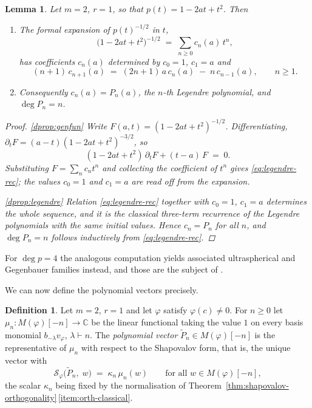 \documentclass[12pt]{amsart}
\theoremstyle{plain}
\newtheorem{lemma}[theorem]{Lemma}
\theoremstyle{definition}
\newtheorem{definition}[theorem]{Definition}
\newcommand{\CC}{\mathbb{C}}
\newcommand{\Mf}{M(\varphi)}          %
\newcommand{\Sf}{\mathcal{S}_\varphi} %
\newcommand{\vf}{v_\varphi}           %
\begin{document}
\begin{lemma}
\label{lem:dictionary-properties}
Let $m = 2$, $r = 1$, so that $p(t) = 1 - 2at + t^2$. Then
\begin{enumerate}[label=\textup{(D\arabic*)}]
  \item\label{dprop:genfun} The formal expansion of $p(t)^{-1/2}$ in $t$,
    \[
      \bigl(1 - 2at + t^2\bigr)^{-1/2} \;=\; \sum_{n \geq 0} c_n(a)\, t^n ,
    \]
    has coefficients $c_n(a)$ determined by $c_0 = 1$, $c_1 = a$ and
    \begin{equation}\label{eq:legendre-rec}
      (n+1)\,c_{n+1}(a) \;=\; (2n+1)\,a\,c_n(a) \;-\; n\,c_{n-1}(a),
      \qquad n \geq 1 .
    \end{equation}
  \item\label{dprop:legendre} Consequently $c_n(a) = P_n(a)$, the $n$-th
    Legendre polynomial, and $\deg P_n = n$.
\end{enumerate}
\begin{proof}
\ref{dprop:genfun} Write $F(a,t) = (1-2at+t^2)^{-1/2}$. Differentiating,
$\partial_t F = (a-t)(1-2at+t^2)^{-3/2}$, so
\[
  (1 - 2at + t^2)\,\partial_t F + (t-a)\,F \;=\; 0 .
\]
Substituting $F = \sum_n c_n t^n$ and collecting the coefficient of $t^n$
gives \eqref{eq:legendre-rec}; the values $c_0 = 1$ and $c_1 = a$ are read
off from the expansion.

\ref{dprop:legendre} Relation \eqref{eq:legendre-rec} together with
$c_0 = 1$, $c_1 = a$ determines the whole sequence, and it is the
classical three-term recurrence of the Legendre polynomials
\cite[eq.~(4.7.17)]{Szego1939} with the same initial values. Hence
$c_n = P_n$ for all $n$, and $\deg P_n = n$ follows inductively from
\eqref{eq:legendre-rec}.
\end{proof}
\end{lemma}

For $\deg p = 4$ the analogous computation yields
associated ultraspherical and Gegenbauer families instead, and those are
the subject of \cite{SantosNeklyudovFutorny2025}.

We can now define the polynomial vectors precisely.

\begin{definition}
\label{def:polynomial-vectors}
Let $m = 2$, $r = 1$ and let $\varphi$ satisfy $\varphi(c) \neq 0$. For
$n \geq 0$ let $\mu_n \colon \Mf[-n] \to \CC$ be the linear functional
taking the value $1$ on every basis monomial $b_{-\lambda}\vf$,
$\lambda \vdash n$. The \emph{polynomial vector} $\tilde{P}_n \in \Mf[-n]$
is the representative of $\mu_n$ with respect to the Shapovalov form,
that is, the unique vector with
\begin{equation}\label{eq:Ptilde-riesz}
  \Sf\bigl(\tilde{P}_n,\; w\bigr) \;=\; \kappa_n\,\mu_n(w)
  \qquad\text{for all } w \in \Mf[-n],
\end{equation}
the scalar $\kappa_n$ being fixed by the normalisation of
Theorem~\textup{\ref{thm:shapovalov-orthogonality}}\,\ref{item:orth-classical}.
\end{definition}
\end{document}
